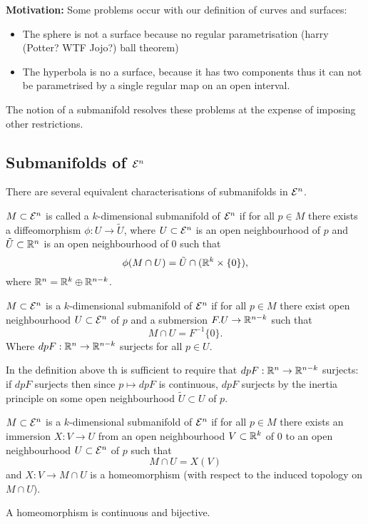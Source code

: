 \textbf{Motivation:} Some problems occur with our definition of curves and surfaces:
\begin{itemize}
	\item The sphere is not a surface because no regular parametrisation  (harry (Potter? WTF Jojo?) ball theorem)
	\item The hyperbola is no a surface, because it has two components thus it can not be parametrised by a single regular map on an open interval.
\end{itemize}

The notion of a submanifold resolves these problems at the expense of imposing other restrictions.

\subsection{Submanifolds of $\mathcal E^n$}
There are several equivalent characterisations of submanifolds in $\mathcal E^n$.

\begin{definition}
	$M \subset \mathcal E^n$ is called a $k$-dimensional submanifold of $\mathcal E^n$ if for all $p \in M$ there exists a diffeomorphism $\phi: U \to \tilde U$, where $U \subset \mathcal E^n$ is an open neighbourhood of $p$ and $\tilde U \subset \mathbb R^n$ is an open neighbourhood of $0$ such that
		\[ \phi(M \cap U)= \tilde U \cap (\mathbb R^k \times \{0\}), \]
	where $\mathbb R^n = \mathbb R^k \oplus \mathbb R^{n-k}$.
\end{definition}

\begin{definition}
	$M \subset \mathcal E^n$ is a $k$-dimensional submanifold of $\mathcal E^n$ if for all $p \in M$ there exist open neighbourhood $U \subset \mathcal E^n$ of $p$ and a submersion $F. U \to \mathbb R^{n-k}$ such that
		\[ M \cap U = F^{-1}\{0\}. \]
	Where $dpF: \mathbb R^n \to \mathbb R^{n-k}$ surjects for all $p \in U$.
\end{definition}

\begin{remark}
	In the definition above th is sufficient to require that $dpF: \mathbb R^n \to \mathbb R^{n-k}$ surjects: if $dpF$ surjects then since $p \mapsto dpF$ is continuous, $dpF$ surjects by the inertia principle on some open neighbourhood $\tilde U \subset U$ of $p$.
\end{remark}

\begin{definition}
	$M \subset \mathcal E^n$ is a $k$-dimensional submanifold of $\mathcal E^n$ if for all $p \in M$ there exists an immersion $X: V \to U$ from an open neighbourhood $V \subset \mathbb R^k$ of $0$ to an open neighbourhood $U \subset \mathcal E^n$ of $p$ such that
		\[ M \cap U = X(V) \]
	and $X:V \to M \cap U$ is a homeomorphism (with respect to the induced topology on $M \cap U$).
	
	A homeomorphism is continuous and bijective.
\end{definition}

